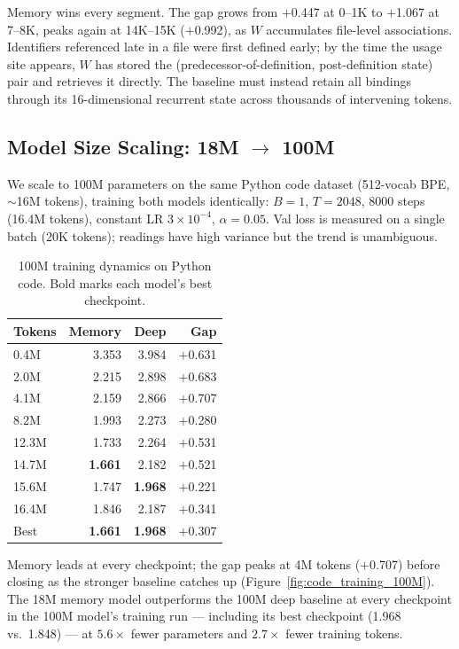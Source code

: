 \documentclass{article}
\begin{document}
Memory wins every segment. The gap grows from $+$0.447 at 0--1K to $+$1.067 at 7--8K, peaks again at 14K--15K ($+$0.992), as $W$ accumulates file-level associations. Identifiers referenced late in a file were first defined early; by the time the usage site appears, $W$ has stored the (predecessor-of-definition, post-definition state) pair and retrieves it directly. The baseline must instead retain all bindings through its 16-dimensional recurrent state across thousands of intervening tokens.

\FloatBarrier
\subsection{Model Size Scaling: 18M $\to$ 100M}

We scale to 100M parameters on the same Python code dataset (512-vocab BPE, ${\sim}$16M tokens), training both models identically: $B{=}1$, $T{=}2048$, 8000 steps (16.4M tokens), constant LR $3{\times}10^{-4}$, $\alpha{=}0.05$. Val loss is measured on a single batch (20K tokens); readings have high variance but the trend is unambiguous.

\begin{table}[h]
\centering
\caption{100M training dynamics on Python code. Bold marks each model's best checkpoint.}
\begin{tabular}{lrrr}
\toprule
Tokens & Memory & Deep & Gap \\
\midrule
0.4M  & 3.353 & 3.984 & $+$0.631 \\
2.0M  & 2.215 & 2.898 & $+$0.683 \\
4.1M  & 2.159 & 2.866 & $+$0.707 \\
8.2M  & 1.993 & 2.273 & $+$0.280 \\
12.3M & 1.733 & 2.264 & $+$0.531 \\
14.7M & \textbf{1.661} & 2.182 & $+$0.521 \\
15.6M & 1.747 & \textbf{1.968} & $+$0.221 \\
\midrule
16.4M & 1.846 & 2.187 & $+$0.341 \\
\midrule
Best  & \textbf{1.661} & \textbf{1.968} & $+$0.307 \\
\bottomrule
\end{tabular}
\end{table}

Memory leads at every checkpoint; the gap peaks at 4M tokens ($+$0.707) before closing as the stronger baseline catches up (Figure~\ref{fig:code_training_100M}). The 18M memory model outperforms the 100M deep baseline at every checkpoint in the 100M model's training run --- including its best checkpoint (1.968 vs.\ 1.848) --- at $5.6\times$ fewer parameters and $2.7\times$ fewer training tokens.
\end{document}
